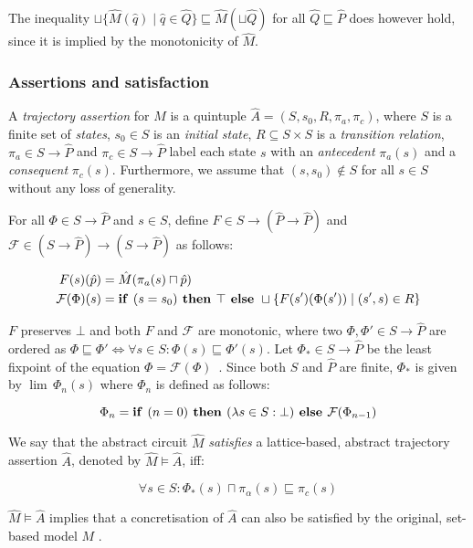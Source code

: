 \noindent The inequality $\sqcup \{ \hat M(\hat q) \mid \hat q \in \hat Q \} \sqsubseteq \hat M(\sqcup \hat Q)$ for all $\hat Q \sqsubseteq \hat P$ does however hold, since it is implied by the monotonicity of $\hat M$.

\subsubsection{Assertions and satisfaction}

A \textit{trajectory assertion} for $\hat M$ is a quintuple $\hat A = (S,s_{0},R,\pi_{a},\pi_{c})$, where $S$ is a finite set of \textit{states}, $s_{0} \in S$ is an \textit{initial state}, $R \subseteq S \times S$ is a \textit{transition relation}, $\pi_{a} \in S \rightarrow \hat P$ and $\pi_{c} \in S \rightarrow \hat P$ label each state $s$ with an \textit{antecedent} $\pi_{a}(s)$ and a \textit{consequent} $\pi_{c}(s)$. Furthermore, we assume that $(s,s_{0}) \notin S$ for all $s \in S$ without any loss of generality.

For all $\Phi \in S \rightarrow \hat P$ and $s \in S$, define $F \in S \rightarrow (\hat P \rightarrow \hat P)$ and $\mathcal{F} \in (S \rightarrow \hat P) \rightarrow (S \rightarrow \hat P)$ as follows:

\begin{align}
F(s)(\hat p) &= \hat M(\pi_{a}(s) \sqcap \hat p) \\
\mathcal{F}(\Phi)(s) &= \textrm{\textbf{if }} (s = s_{0}) \textrm{\textbf{ then }} \top \textrm{\textbf{ else }} \sqcup \{ F(s')(\Phi(s')) \mid (s',s) \in R \}
\end{align}

\noindent $F$ preserves $\bot$ and both $F$ and $\mathcal{F}$ are monotonic, where two $\Phi, \Phi' \in S \rightarrow \hat P$ are ordered as $\Phi \sqsubseteq \Phi' \iff \forall s \in S : \Phi(s) \sqsubseteq \Phi'(s)$. Let $\Phi_{*} \in S \rightarrow \hat P$ be the least fixpoint of the equation $\Phi = \mathcal{F}(\Phi)$~\cite{davey2002}. Since both $S$ and $\hat P$ are finite, $\Phi_{*}$ is given by $\lim \, \Phi_{n}(s)$ where $\Phi_{n}$ is defined as follows:

\begin{equation}
\Phi_{n} = \textrm{\textbf{if }} (n = 0) \textrm{\textbf{ then }} (\lambda s \in S : \bot) \textrm{\textbf{ else }} \mathcal{F}(\Phi_{n-1})
\end{equation}

We say that the abstract circuit $\hat M$ \textit{satisfies} a lattice-based, abstract trajectory assertion $\hat A$, denoted by $\hat M \models \hat A$, iff:

\begin{equation}
\forall s \in S : \Phi_{*}(s) \sqcap \pi_{\alpha}(s) \sqsubseteq \pi_{c}(s)
\end{equation}

\noindent $\hat M \models \hat A$ implies that a concretisation of $\hat A$ can also be satisfied by the original, set-based model $M$ \cite{chou1999}.
